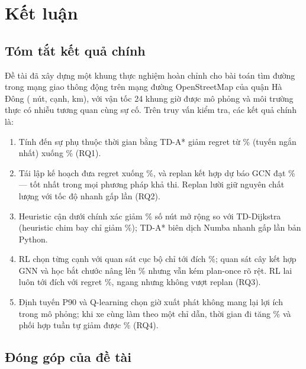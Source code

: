 \section{Kết luận}\label{sec:conclusion}

\subsection{Tóm tắt kết quả chính}\label{sec:conclusion:summary}

Đề tài đã xây dựng một khung thực nghiệm hoàn chỉnh cho bài toán tìm đường trong mạng giao thông động trên mạng đường
OpenStreetMap của quận Hà Đông (\NNodes{} nút, \NEdges{} cạnh, \TotalKm{} km), với vận tốc 24 khung giờ được mô phỏng và môi
trường thực có nhiễu tương quan cùng sự cố. Trên \NTest{} truy vấn kiểm tra, các kết quả chính là:
\begin{enumerate}[label=(\arabic*)]
    \item Tính đến sự phụ thuộc thời gian bằng TD-A* giảm regret từ \DijRegret\% (tuyến ngắn nhất) xuống \PoRegret\% (RQ1).
    \item Tái lập kế hoạch đưa regret xuống \RpRegret\%, và replan kết hợp dự báo GCN đạt \RpGnnRegret\% --- tốt nhất trong mọi
    phương pháp khả thi. Replan lười giữ nguyên chất lượng với tốc độ nhanh gấp \LazySpeedup{} lần (RQ2).
    \item Heuristic cận dưới chính xác giảm \LbReduction\% số nút mở rộng so với TD-Dijkstra (heuristic chim bay chỉ giảm
    \TdAstarReduction\%); TD-A* biên dịch Numba nhanh gấp \NumbaSpeedup{} lần bản Python.
    \item RL chọn từng cạnh với quan sát cục bộ chỉ tới đích \RlSuccess\%; quan sát cây kết hợp GNN và học bắt chước nâng lên
    \RlTreeBcSuccess\% nhưng vẫn kém plan-once rõ rệt. RL lai luôn tới đích với regret \RlHybRegret\%, ngang nhưng không vượt
    replan (RQ3).
    \item Định tuyến P90 và Q-learning chọn giờ xuất phát không mang lại lợi ích trong mô phỏng; khi \MaVeh{} xe cùng làm theo
    một chỉ dẫn, thời gian đi tăng \MaNaiveInc\% và phối hợp tuần tự giảm được \MaCoordGain\% (RQ4).
\end{enumerate}

\subsection{Đóng góp của đề tài}\label{sec:conclusion:contrib}

